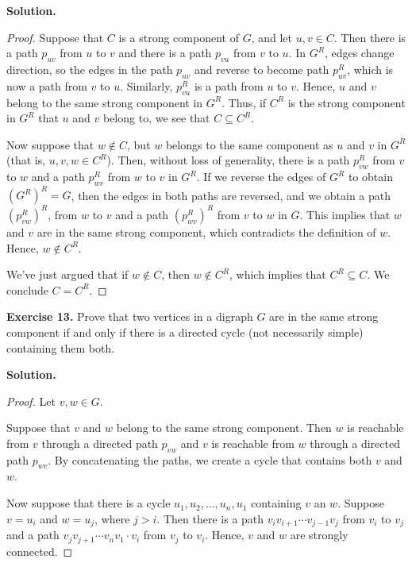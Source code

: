 \documentclass[12pt, a4paper]{article}
\newenvironment{ex}[2][Exercise]
{\par\medskip\noindent \textbf{#1 #2.}}
{\medskip}
\newenvironment{sol}[1][Solution]
{\par\medskip\noindent \textbf{#1.} }
{\medskip}
\begin{document}
	\begin{sol}
		\begin{proof}
			Suppose that $C$ is a strong component of $G$, and let $u,v\in C$.
			Then there is a path $p_{uv}$ from $u$ to $v$ and there is a path $p_{vu}$
			from $v$ to $u$. In $G^R$, edges change direction, so the edges in
			the path $p_{uv}$ and reverse to become path $p_{uv}^R$, which is
			now a path from $v$ to $u$. Similarly, $p_{vu}^R$ is a path from $u$
			to $v$. Hence, $u$ and $v$ belong to the same strong component in $G^R$.
			Thus, if $C^R$ is the strong component in $G^R$ that $u$ and $v$ belong
			to, we see that $C\subseteq C^R$.
			
			Now suppose that $w\notin C$, but $w$ belongs to the same component
			as $u$ and $v$ in $G^R$ (that is, $u,v,w\in C^R$). Then, without loss of
			generality, there is a path
			$p_{vw}^R$ from $v$ to $w$ and a path $p_{wv}^R$ from $w$ to $v$ in $G^R$.
			If we reverse the edges of $G^R$ to obtain $(G^R)^R=G$, then the edges
			in both paths are reversed, and we obtain a path $(p_{vw}^R)^R$, from $w$
			to $v$ and a path $(p_{wv}^R)^R$ from $v$ to $w$ in $G$. This implies that
			$w$ and $v$ are in the same strong component, which contradicts the definition
			of $w$. Hence, $w\notin C^R$.
			
			We've just argued that if $w\notin C$, then $w\notin C^R$, which implies that
			$C^R\subseteq C$. We conclude $C=C^R$.
		\end{proof}
	\end{sol}
	\begin{ex}{13}
		Prove that two vertices in a digraph $G$ are in the same strong component
		if and only if there is a directed cycle (not necessarily simple) containing
		them both.
	\end{ex}
	\begin{sol}
		\begin{proof}
			Let $v,w\in G$.
			
			Suppose that $v$ and $w$ belong to the same strong component. Then $w$
			is reachable from $v$ through a directed path $p_{vw}$ and $v$ is reachable
			from $w$ through a directed path $p_{wv}$. By concatenating the paths, we
			create a cycle that contains both $v$ and $w$.
			
			Now suppose that there is a cycle $u_1,u_2,\ldots,u_n,u_1$ containing
			$v$ an $w$. Suppose $v=u_i$ and $w=u_j$, where $j>i$. Then there is a path
			$v_iv_{i+1}\cdots v_{j-1}v_j$ from $v_i$ to $v_j$ and a path
			$v_jv_{j+1}\cdots v_nv_1\cdot v_i$ from $v_j$ to $v_i$. Hence,
			$v$ and $w$ are strongly connected.
		\end{proof}
	\end{sol}
\end{document}
